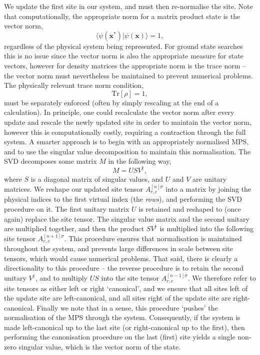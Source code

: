 We update the first site in our system, and must then re-normalise the site. Note that computationally, the appropriate norm for a matrix product state is the vector norm,
\begin{equation}
	\langle \psi(\mathbf{x}^{*}) | \psi(\mathbf{x}) \rangle = 1,
	\label{eq:vs1-12}
\end{equation}
regardless of the physical system being represented. For ground state searches this is no issue since the vector norm is also the appropriate measure for state vectors, however for density matrices the appropriate norm is the trace norm -- the vector norm must nevertheless be maintained to prevent numerical problems. The physically relevant trace norm condition,
\begin{equation}
	\mathrm{Tr}[\rho] = 1,
	\label{eq:vs1-13}
\end{equation}
must be separately enforced (often by simply rescaling at the end of a calculation). In principle, one could recalculate the vector norm after every update and rescale the newly updated site in order to maintain the vector norm, however this is computationally costly, requiring a contraction through the full system. A smarter approach is to begin with an appropriately normalised MPS, and to use the singular value decomposition to maintain this normalisation. The SVD decomposes some matrix \(M\) in the following way,
\begin{equation}
	M = U S V^{\dagger},
	\label{eq:vs1-14}
\end{equation}
where \(S\) is a diagonal matrix of singular values, and \(U\) and \(V\) are unitary matrices. We reshape our updated site tensor \(A^{[n] \sigma}_{r,c}\) into a matrix by joining the physical indices to the first virtual index (the \emph{rows}), and performing the SVD procedure on it. The first unitary matrix \(U\) is retained and reshaped to (once again) replace the site tensor. The singular value matrix and the second unitary are multiplied together, and then the product \(SV^{\dagger}\) is multiplied into the following site tensor \(A^{[n+1] \sigma}_{r,c}\). This procedure ensures that normalisation is maintained throughout the system, and prevents large differences in scale between site tensors, which would cause numerical problems. That said, there is clearly a directionality to this procedure -- the reverse procedure is to retain the second unitary \(V^{\dagger}\), and to multiply \(US\) into the site tensor \(A^{[n-1] \sigma}_{r,c}\). We therefore refer to site tensors as either left or right `canonical', and we ensure that all sites left of the update site are left-canonical, and all sites right of the update site are right-canonical. Finally we note that in a sense, this procedure `pushes' the normalisation of the MPS through the system. Consequently, if the system is made left-canonical up to the last site (or right-canonical up to the first), then performing the canonisation procedure on the last (first) site yields a single non-zero singular value, which is the vector norm of the state.

